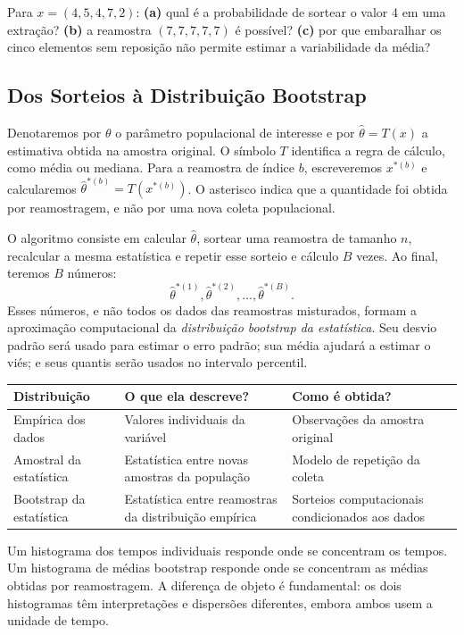 \documentclass[12pt,a4paper]{article}
\begin{document}
\begin{perguntabox}
Para $x=(4,5,4,7,2)$: \textbf{(a)} qual é a probabilidade de sortear o valor 4 em uma extração? \textbf{(b)} a reamostra $(7,7,7,7,7)$ é possível? \textbf{(c)} por que embaralhar os cinco elementos sem reposição não permite estimar a variabilidade da média?
\end{perguntabox}

\subsection{Dos Sorteios à Distribuição Bootstrap}
Denotaremos por $\theta$ o parâmetro populacional de interesse e por $\hat\theta=T(x)$ a estimativa obtida na amostra original. O símbolo $T$ identifica a regra de cálculo, como média ou mediana. Para a reamostra de índice $b$, escreveremos $x^{*(b)}$ e calcularemos $\hat\theta^{*(b)}=T(x^{*(b)})$. O asterisco indica que a quantidade foi obtida por reamostragem, e não por uma nova coleta populacional.

O algoritmo consiste em calcular $\hat\theta$, sortear uma reamostra de tamanho $n$, recalcular a mesma estatística e repetir esse sorteio e cálculo $B$ vezes. Ao final, teremos $B$ números:
\[
\hat\theta^{*(1)},\hat\theta^{*(2)},\ldots,\hat\theta^{*(B)}.
\]
Esses números, e não todos os dados das reamostras misturados, formam a aproximação computacional da \emph{distribuição bootstrap da estatística}. Seu desvio padrão será usado para estimar o erro padrão; sua média ajudará a estimar o viés; e seus quantis serão usados no intervalo percentil.

\begin{center}
\small
\renewcommand{\arraystretch}{1.35}
\begin{tabularx}{\textwidth}{p{3.5cm}XX}
\toprule
\textbf{Distribuição} & \textbf{O que ela descreve?} & \textbf{Como é obtida?}\\
\midrule
Empírica dos dados & Valores individuais da variável & Observações da amostra original\\
Amostral da estatística & Estatística entre novas amostras da população & Modelo de repetição da coleta\\
Bootstrap da estatística & Estatística entre reamostras da distribuição empírica & Sorteios computacionais condicionados aos dados\\
\bottomrule
\end{tabularx}
\end{center}
Um histograma dos tempos individuais responde onde se concentram os tempos. Um histograma de médias bootstrap responde onde se concentram as médias obtidas por reamostragem. A diferença de objeto é fundamental: os dois histogramas têm interpretações e dispersões diferentes, embora ambos usem a unidade de tempo.
\end{document}
